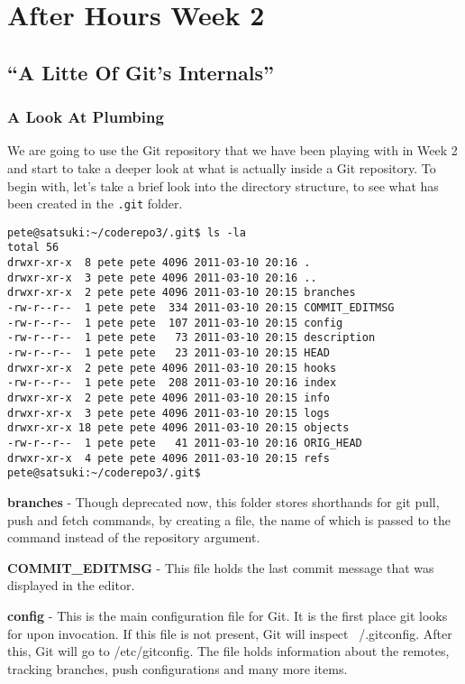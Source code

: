 \chapter{After Hours Week 2}
\section{``A Litte Of Git's Internals''}
\subsection{A Look At Plumbing}

We are going to use the Git repository that we have been playing with in Week 2 and start to take a deeper look at what is actually inside a Git repository.  To begin with, let's take a brief look into the directory structure, to see what has been created in the \texttt{.git} folder.

\begin{Verbatim}[frame=leftline,framerule=1mm,fontsize=\relsize{-3}] 
pete@satsuki:~/coderepo3/.git$ ls -la
total 56
drwxr-xr-x  8 pete pete 4096 2011-03-10 20:16 .
drwxr-xr-x  3 pete pete 4096 2011-03-10 20:16 ..
drwxr-xr-x  2 pete pete 4096 2011-03-10 20:15 branches
-rw-r--r--  1 pete pete  334 2011-03-10 20:15 COMMIT_EDITMSG
-rw-r--r--  1 pete pete  107 2011-03-10 20:15 config
-rw-r--r--  1 pete pete   73 2011-03-10 20:15 description
-rw-r--r--  1 pete pete   23 2011-03-10 20:15 HEAD
drwxr-xr-x  2 pete pete 4096 2011-03-10 20:15 hooks
-rw-r--r--  1 pete pete  208 2011-03-10 20:16 index
drwxr-xr-x  2 pete pete 4096 2011-03-10 20:15 info
drwxr-xr-x  3 pete pete 4096 2011-03-10 20:15 logs
drwxr-xr-x 18 pete pete 4096 2011-03-10 20:15 objects
-rw-r--r--  1 pete pete   41 2011-03-10 20:16 ORIG_HEAD
drwxr-xr-x  4 pete pete 4096 2011-03-10 20:15 refs
pete@satsuki:~/coderepo3/.git$ 

\end{Verbatim} 

\textbf{branches} - Though deprecated now, this folder stores shorthands for git pull, push and fetch commands, by creating a file, the name of which is passed to the command instead of the repository argument.

\textbf{COMMIT_EDITMSG} - This file holds the last commit message that was displayed in the editor.

\textbf{config} - This is the main configuration file for Git.  It is the first place git looks for upon invocation.  If this file is not present, Git will inspect ~/.gitconfig.  After this, Git will go to /etc/gitconfig.  The file holds information about the remotes, tracking branches, push configurations and many more items.

